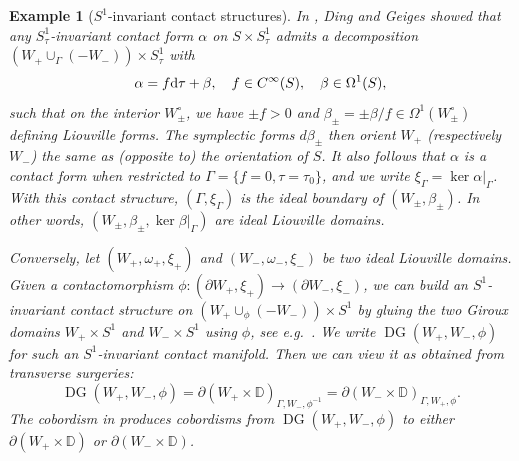 \documentclass[11pt]{amsart}
\numberwithin{equation}{section}
\newtheorem{example}[theorem]{\textbf{Example}}
\def\D{{\mathbb D}}
\def\rd{{\rm d}}
\DeclareMathOperator{\DG}{DG}
\begin{document}
\begin{example}[$S^1$-invariant contact structures]\label{ex:S1}
In \cite{DingGeiges:S1}, Ding and Geiges showed that any $S^1_{\tau}$-invariant contact form $\alpha$ on $S\times S^1_{\tau}$ admits a decomposition 
$(W_+\cup_{\Gamma} (-W_-))\times S^1_{\tau}$ with 
\begin{equation*}
\alpha=f\rd \tau +\beta, \quad f\in C^\infty(S), \quad \beta \in \Omega^{1}(S),
\end{equation*}
such that on the interior $W^{\circ}_{\pm}$, we have $\pm f>0$ and $\beta_{\pm} = \pm \beta/f \in \Omega^{1}(W_{\pm}^{\circ})$ defining Liouville forms. The symplectic forms $d\beta_{\pm}$ then orient $W_{+}$ (respectively $W_{-}$) the same as (opposite to) the orientation of $S$. It also follows that $\alpha$ is a contact form when restricted to $\Gamma=\{f=0, \tau=\tau_{0}\}$, and we write $\xi_{\Gamma} = \ker \alpha|_{\Gamma}$. With this contact structure, $(\Gamma, \xi_{\Gamma})$ is the ideal boundary of $(W_{\pm}, \beta_{\pm})$. In other words, $(W_{\pm}, \beta_{\pm},\ker \beta|_{\Gamma})$ are ideal Liouville domains.

Conversely, let $(W_+,\omega_+,\xi_+)$ and $(W_-,\omega_-,\xi_-)$ be two ideal Liouville domains. Given a contactomorphism $\phi:(\partial W_+,\xi_+)\to (\partial W_-,\xi_-)$, we can build an $S^1$-invariant contact structure on $(W_+\cup_{\phi}(-W_-))\times S^1$ by gluing the two Giroux domains $W_+\times S^1$ and $W_-\times S^1$ using $\phi$, see e.g.\ \cite[\S 2.2]{AZ}. We write $\DG(W_+,W_-,\phi)$ for such an $S^1$-invariant contact manifold. Then we can view it as obtained from transverse surgeries:
$$\DG(W_+,W_-,\phi) = \partial(W_+\times \D)_{\Gamma,W_-,\phi^{-1}}= \partial(W_-\times \D)_{\Gamma,W_+,\phi}.$$
The cobordism in  produces cobordisms from $\DG(W_+,W_-,\phi)$ to either $\partial(W_+\times \D)$ or $\partial (W_-\times \D)$.
\end{example}
\end{document}
